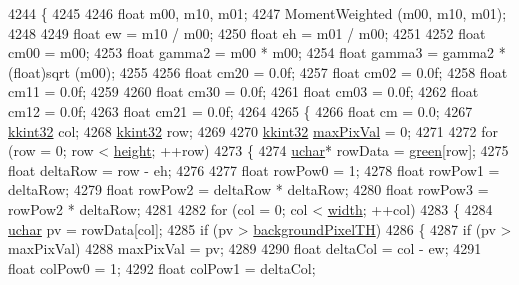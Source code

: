 \begin{DoxyCode}
4244 \{
4245 
4246   \textcolor{keywordtype}{float}  m00, m10, m01;
4247   MomentWeighted (m00, m10, m01);
4248 
4249   \textcolor{keywordtype}{float} ew  = m10 / m00;
4250   \textcolor{keywordtype}{float} eh  = m01 / m00;
4251         
4252   \textcolor{keywordtype}{float} cm00   = m00;
4253   \textcolor{keywordtype}{float} gamma2 = m00 * m00;
4254   \textcolor{keywordtype}{float} gamma3 = gamma2 * (float)sqrt (m00);
4255         
4256   \textcolor{keywordtype}{float} cm20 = 0.0f;
4257   \textcolor{keywordtype}{float} cm02 = 0.0f;
4258   \textcolor{keywordtype}{float} cm11 = 0.0f;
4259 
4260   \textcolor{keywordtype}{float} cm30 = 0.0f;
4261   \textcolor{keywordtype}{float} cm03 = 0.0f;
4262   \textcolor{keywordtype}{float} cm12 = 0.0f;
4263   \textcolor{keywordtype}{float} cm21 = 0.0f;
4264 
4265   \{
4266     \textcolor{keywordtype}{float}  cm = 0.0;
4267     \hyperlink{namespace_k_k_b_a8fa4952cc84fda1de4bec1fbdd8d5b1b}{kkint32}  col;
4268     \hyperlink{namespace_k_k_b_a8fa4952cc84fda1de4bec1fbdd8d5b1b}{kkint32}  row;
4269    
4270     \hyperlink{namespace_k_k_b_a8fa4952cc84fda1de4bec1fbdd8d5b1b}{kkint32}  \hyperlink{class_k_k_b_1_1_raster_a4f37d3b83826f522f61af0918a1d5546}{maxPixVal} = 0;
4271 
4272     \textcolor{keywordflow}{for}  (row = 0;  row < \hyperlink{class_k_k_b_1_1_raster_af39ff189de4fbb6de98392e187efafb7}{height};  ++row)
4273     \{
4274       \hyperlink{namespace_k_k_b_ace9969169bf514f9ee6185186949cdf7}{uchar}*  rowData = \hyperlink{class_k_k_b_1_1_raster_a2d2238911145488e226cd2e34fc8448c}{green}[row];
4275       \textcolor{keywordtype}{float}  deltaRow = row - eh;
4276 
4277       \textcolor{keywordtype}{float}  rowPow0 = 1;
4278       \textcolor{keywordtype}{float}  rowPow1 = deltaRow;
4279       \textcolor{keywordtype}{float}  rowPow2 = deltaRow * deltaRow;
4280       \textcolor{keywordtype}{float}  rowPow3 = rowPow2  * deltaRow;
4281 
4282       \textcolor{keywordflow}{for}  (col = 0;  col < \hyperlink{class_k_k_b_1_1_raster_ae0bcc103e191c3421d7692dc69ceb554}{width};  ++col)
4283       \{
4284         \hyperlink{namespace_k_k_b_ace9969169bf514f9ee6185186949cdf7}{uchar} pv = rowData[col];
4285         \textcolor{keywordflow}{if}  (pv > \hyperlink{class_k_k_b_1_1_raster_a3c4e96eaf48274f5d8912617f81f2a0b}{backgroundPixelTH})
4286         \{
4287           \textcolor{keywordflow}{if}  (pv > maxPixVal)
4288             maxPixVal = pv;
4289 
4290           \textcolor{keywordtype}{float}  deltaCol = col - ew;
4291           \textcolor{keywordtype}{float}  colPow0 = 1;
4292           \textcolor{keywordtype}{float}  colPow1 = deltaCol;

\end{DoxyCode}

